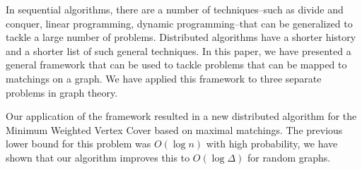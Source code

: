 In sequential algorithms, there are a number of techniques--such as divide and conquer, linear programming, dynamic programming--that can be generalized to tackle a large number of problems. Distributed algorithms have a shorter history and a shorter list of such general techniques. In this paper, we have presented a general framework that can be used to tackle problems that can be mapped to matchings on a graph. We have applied this framework to three separate problems in graph theory.

Our application of the framework resulted in a new distributed algorithm for the Minimum Weighted Vertex Cover based on maximal matchings. The previous lower bound for this problem was $O(\log n)$ with high probability, we have shown that our algorithm improves this to $O(\log \Delta)$ for random graphs. 
